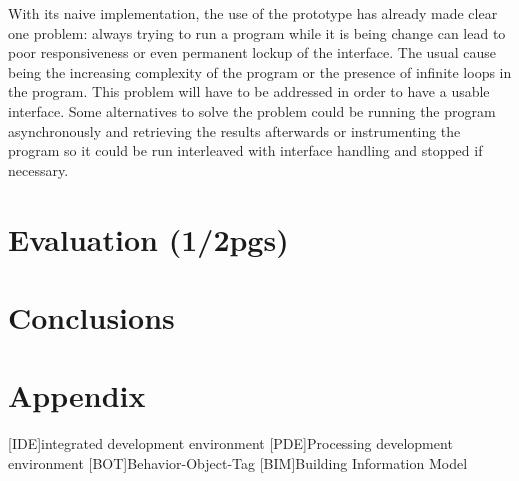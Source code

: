 \documentclass{./llncs2e/llncs}
\begin{document}
	With its naive implementation, the use of the prototype has already made clear one problem: always trying to run a program while it is being change can lead to poor responsiveness or even permanent lockup of the interface. The usual cause being the increasing complexity of the program or the presence of infinite loops in the program. This problem will have to be addressed in order to have a usable interface. Some alternatives to solve the problem could be running the program asynchronously and retrieving the results afterwards or instrumenting the program so it could be run interleaved with interface handling and stopped if necessary.



\section{Evaluation (1/2pgs)}

\section{Conclusions}

\newpage
\appendix
\section{Appendix}
\label{sec:attachments}

\begin{acronym}
	[IDE]{integrated development environment}
	[PDE]{Processing development environment}
	[BOT]{Behavior-Object-Tag}
	[BIM]{Building Information Model}
\end{acronym}

% 
% 
 

 
\end{document}

